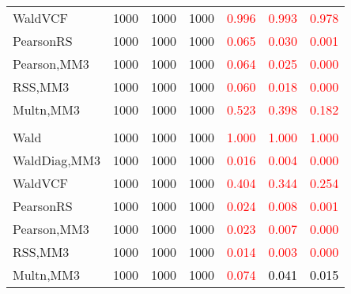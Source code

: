 \documentclass[
]{article}
\begin{document}
\begin{table}[H]
{\begin{tabular}[t]{lrrrrrr}
\hspace{1em}WaldVCF & 1000 & 1000 & 1000 & \textcolor{red}{0.996} & \textcolor{red}{0.993} & \textcolor{red}{0.978}\\
\hspace{1em}PearsonRS & 1000 & 1000 & 1000 & \textcolor{red}{0.065} & \textcolor{red}{0.030} & \textcolor{red}{0.001}\\
\hspace{1em}Pearson,MM3 & 1000 & 1000 & 1000 & \textcolor{red}{0.064} & \textcolor{red}{0.025} & \textcolor{red}{0.000}\\
\hspace{1em}RSS,MM3 & 1000 & 1000 & 1000 & \textcolor{red}{0.060} & \textcolor{red}{0.018} & \textcolor{red}{0.000}\\
\hspace{1em}Multn,MM3 & 1000 & 1000 & 1000 & \textcolor{red}{0.523} & \textcolor{red}{0.398} & \textcolor{red}{0.182}\\
\addlinespace[0.3em]
\multicolumn{7}{l}{\textbf{3F 15V}}\\
\hspace{1em}Wald & 1000 & 1000 & 1000 & \textcolor{red}{1.000} & \textcolor{red}{1.000} & \textcolor{red}{1.000}\\
\hspace{1em}WaldDiag,MM3 & 1000 & 1000 & 1000 & \textcolor{red}{0.016} & \textcolor{red}{0.004} & \textcolor{red}{0.000}\\
\hspace{1em}WaldVCF & 1000 & 1000 & 1000 & \textcolor{red}{0.404} & \textcolor{red}{0.344} & \textcolor{red}{0.254}\\
\hspace{1em}PearsonRS & 1000 & 1000 & 1000 & \textcolor{red}{0.024} & \textcolor{red}{0.008} & \textcolor{red}{0.001}\\
\hspace{1em}Pearson,MM3 & 1000 & 1000 & 1000 & \textcolor{red}{0.023} & \textcolor{red}{0.007} & \textcolor{red}{0.000}\\
\hspace{1em}RSS,MM3 & 1000 & 1000 & 1000 & \textcolor{red}{0.014} & \textcolor{red}{0.003} & \textcolor{red}{0.000}\\
\hspace{1em}Multn,MM3 & 1000 & 1000 & 1000 & \textcolor{red}{0.074} & \textcolor{black}{0.041} & \textcolor{black}{0.015}\\
\bottomrule
\end{tabular}}
\endgroup{}
\end{table}
\end{document}
